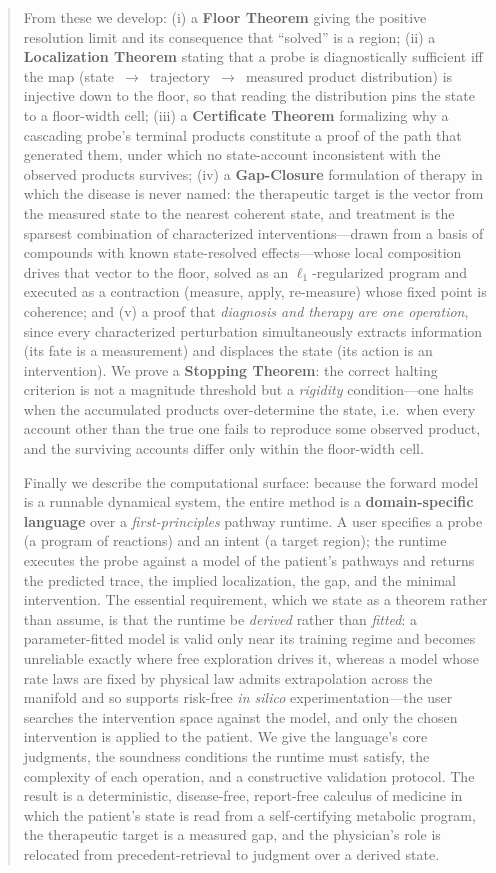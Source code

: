 \documentclass[11pt,a4paper]{article}
\theoremstyle{thmstyle}
\theoremstyle{definition}
\theoremstyle{remark}
\begin{document}
\begin{abstract}
From these we develop: (i) a \textbf{Floor Theorem} giving the positive
resolution limit and its consequence that ``solved'' is a region; (ii) a
\textbf{Localization Theorem} stating that a probe is diagnostically
sufficient iff the map (state~$\to$~trajectory~$\to$~measured product
distribution) is injective down to the floor, so that reading the
distribution pins the state to a floor-width cell; (iii) a
\textbf{Certificate Theorem} formalizing why a cascading probe's
terminal products constitute a proof of the path that generated them,
under which no state-account inconsistent with the observed products
survives; (iv) a \textbf{Gap-Closure} formulation of therapy in which the
disease is never named: the therapeutic target is the vector from the
measured state to the nearest coherent state, and treatment is the
sparsest combination of characterized interventions---drawn from a basis
of compounds with known state-resolved effects---whose local composition
drives that vector to the floor, solved as an $\ell_1$-regularized program
and executed as a contraction (measure, apply, re-measure) whose fixed
point is coherence; and (v) a proof that \emph{diagnosis and therapy are
one operation}, since every characterized perturbation simultaneously
extracts information (its fate is a measurement) and displaces the state
(its action is an intervention). We prove a \textbf{Stopping Theorem}: the
correct halting criterion is not a magnitude threshold but a
\emph{rigidity} condition---one halts when the accumulated products
over-determine the state, i.e.\ when every account other than the true one
fails to reproduce some observed product, and the surviving accounts differ
only within the floor-width cell.

Finally we describe the computational surface: because the forward model
is a runnable dynamical system, the entire method is a
\textbf{domain-specific language} over a \emph{first-principles} pathway
runtime. A user specifies a probe (a program of reactions) and an intent
(a target region); the runtime executes the probe against a model of the
patient's pathways and returns the predicted trace, the implied
localization, the gap, and the minimal intervention. The essential
requirement, which we state as a theorem rather than assume, is that the
runtime be \emph{derived} rather than \emph{fitted}: a parameter-fitted
model is valid only near its training regime and becomes unreliable
exactly where free exploration drives it, whereas a model whose rate laws
are fixed by physical law admits extrapolation across the manifold and so
supports risk-free \emph{in silico} experimentation---the user searches
the intervention space against the model, and only the chosen intervention
is applied to the patient. We give the language's core judgments, the
soundness conditions the runtime must satisfy, the complexity of each
operation, and a constructive validation protocol. The result is a
deterministic, disease-free, report-free calculus of medicine in which
the patient's state is read from a self-certifying metabolic program, the
therapeutic target is a measured gap, and the physician's role is
relocated from precedent-retrieval to judgment over a derived state.
\end{abstract}
\end{document}
